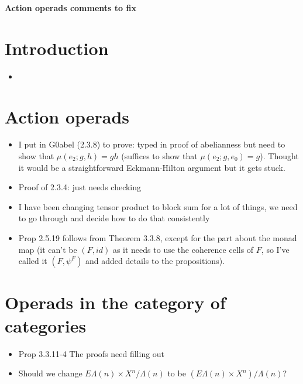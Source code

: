 \documentclass{amsart}
\begin{document}
\begin{center}
\begin{Large}
\textbf{Action operads comments to fix}
\end{Large}
\end{center}
\vskip1cm

\section{ Introduction}
\begin{itemize}
\item

\end{itemize}
\section{ Action operads}
\begin{itemize}
\item I put in G0abel (2.3.8) to prove: typed in proof of abelianness but need to show that $\mu(e_2;g,h) = gh$ (suffices to show that $\mu(e_2;g, e_0) = g$). Thought it would be a straightforward Eckmann-Hilton argument but it gets stuck.
\item Proof of 2.3.4: just needs checking
\item I have been changing tensor product to block sum for a lot of things, we need to go through and decide how to do that consistently
\item Prop 2.5.19 follows from Theorem 3.3.8, except for the part about the monad map (it can't be $(F,id)$ as it needs to use the coherence cells of $F$, so I've called it $(F,\psi^F)$ and added details to the propositions).
\end{itemize}

\section{Operads in the category of categories}
\begin{itemize}
\item Prop 3.3.11-4 The proofs need filling out
\item Should we change $E\Lambda(n) \times X^n/\Lambda(n)$ to be $\left(E\Lambda(n) \times X^n\right)/\Lambda(n)$?
\end{itemize}
\end{document}
